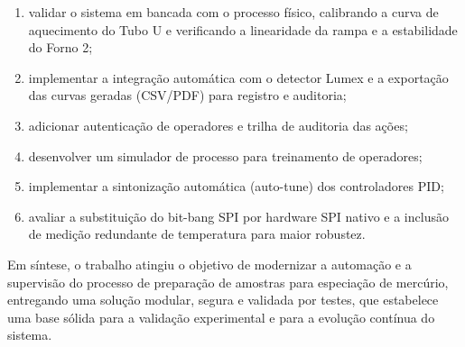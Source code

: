 \begin{enumerate}[label=\arabic*)]
  \item validar o sistema em bancada com o processo físico, calibrando a curva
  de aquecimento do Tubo U e verificando a linearidade da rampa e a estabilidade
  do Forno 2;
  \item implementar a integração automática com o detector Lumex e a exportação
  das curvas geradas (CSV/PDF) para registro e auditoria;
  \item adicionar autenticação de operadores e trilha de auditoria das ações;
  \item desenvolver um simulador de processo para treinamento de operadores;
  \item implementar a sintonização automática (auto-tune) dos controladores PID;
  \item avaliar a substitui\c{c}\~ao do bit-bang SPI por hardware SPI nativo e a
  inclus\~ao de medi\c{c}\~ao redundante de temperatura para maior robustez.
\end{enumerate}

Em síntese, o trabalho atingiu o objetivo de modernizar a automação e a
supervisão do processo de preparação de amostras para especiação de mercúrio,
entregando uma solução modular, segura e validada por testes, que estabelece uma
base sólida para a validação experimental e para a evolução contínua do sistema.

